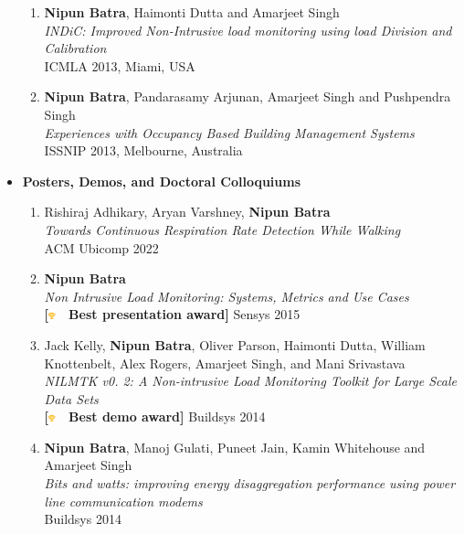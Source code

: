 \documentclass[letter,10pt]{article}
\begin{document}
\begin{itemize}
\begin{enumerate}
		\item 
				{\textbf{Nipun Batra}, Haimonti Dutta and Amarjeet Singh} \\
		\textit{INDiC: Improved Non-Intrusive load monitoring using load Division and Calibration} \\
		{ICMLA 2013, Miami, USA}
		
		\item 
		{\textbf{Nipun Batra}, Pandarasamy Arjunan, Amarjeet Singh and Pushpendra Singh}\\
		\textit{Experiences with Occupancy Based Building Management Systems} \\
		{ISSNIP 2013, Melbourne, Australia}
    \end{enumerate}
    
     \item[]\textbf{Posters, Demos, and Doctoral Colloquiums}
    \begin{enumerate}


\item Rishiraj Adhikary, Aryan Varshney, \textbf{Nipun Batra} \\
\textit{Towards Continuous Respiration Rate Detection
While Walking}\\
ACM Ubicomp 2022
    
        \item {\textbf{Nipun Batra}} \\
        \textit{Non Intrusive Load Monitoring: Systems, Metrics and Use Cases} \\
 \textbf{[\includegraphics[height=0.8em]{trophy.pdf}~ Best presentation award]}
{Sensys 2015}

\item {Jack Kelly, \textbf{Nipun Batra}, Oliver Parson, Haimonti Dutta, William Knottenbelt, Alex Rogers, Amarjeet Singh,
	and Mani Srivastava}\\
\textit{NILMTK v0. 2: A Non-intrusive Load Monitoring Toolkit for Large Scale Data Sets}\\ 
 \textbf{[\includegraphics[height=0.8em]{trophy.pdf}~ Best demo award]}
{Buildsys 2014}

\item {\textbf{Nipun Batra}, Manoj Gulati, Puneet Jain, Kamin Whitehouse and Amarjeet Singh} \\ 
\textit{Bits and watts: improving
	energy disaggregation performance using power line communication modems} \\
{Buildsys 2014}



\end{enumerate}
\end{itemize}
\end{document}
